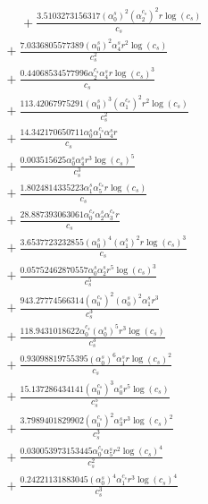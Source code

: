 \documentclass[10pt]{article}
\begin{document}
\begin{align*}
\phantom{R_{3,9}} &\phantom{={}}{}  + \frac{3.5103273156317 \left(\alpha_{0}^s\right)^{2} \left(\alpha_{2}^{c_s}\right)^{2} r \log{\left(c_{s} \right)}}{c_{s}} \\
&{}  + \frac{7.0336805577389 \left(\alpha_{0}^s\right)^{2} \alpha_{4}^s r^{2} \log{\left(c_{s} \right)}}{c_{s}^{2}} \\
&{}  + \frac{0.44068534577996 \alpha_{2}^{c_s} \alpha_{4}^s r \log{\left(c_{s} \right)}^{3}}{c_{s}} \\
&{}  + \frac{113.42067975291 \left(\alpha_{0}^s\right)^{3} \left(\alpha_{1}^{c_s}\right)^{2} r^{2} \log{\left(c_{s} \right)}}{c_{s}^{2}} \\
&{}  + \frac{14.342170650711 \alpha_{0}^s \alpha_{1}^{c_s} \alpha_{4}^s r}{c_{s}} \\
&{}  + \frac{0.003515625 \alpha_{0}^s \alpha_{4}^s r^{3} \log{\left(c_{s} \right)}^{5}}{c_{s}^{3}} \\
&{}  + \frac{1.8024814335223 \alpha_{1}^s \alpha_{5}^{c_s} r \log{\left(c_{s} \right)}}{c_{s}} \\
&{}  + \frac{28.887393063061 \alpha_{0}^{c_s} \alpha_{2}^s \alpha_{3}^{c_s} r}{c_{s}} \\
&{}  + \frac{3.6537723232855 \left(\alpha_{0}^s\right)^{4} \left(\alpha_{1}^s\right)^{2} r \log{\left(c_{s} \right)}^{3}}{c_{s}} \\
&{}  + \frac{0.05752462870557 \alpha_{0}^s \alpha_{2}^s r^{5} \log{\left(c_{s} \right)}^{3}}{c_{s}^{5}} \\
&{}  + \frac{943.27774566314 \left(\alpha_{0}^{c_s}\right)^{2} \left(\alpha_{0}^s\right)^{2} \alpha_{1}^s r^{3}}{c_{s}^{3}} \\
&{}  + \frac{118.9431018622 \alpha_{0}^{c_s} \left(\alpha_{0}^s\right)^{5} r^{3} \log{\left(c_{s} \right)}}{c_{s}^{3}} \\
&{}  + \frac{0.93098819755395 \left(\alpha_{0}^s\right)^{6} \alpha_{1}^s r \log{\left(c_{s} \right)}^{2}}{c_{s}} \\
&{}  + \frac{15.137286434141 \left(\alpha_{0}^{c_s}\right)^{3} \alpha_{0}^s r^{5} \log{\left(c_{s} \right)}}{c_{s}^{5}} \\
&{}  + \frac{3.7989401829902 \left(\alpha_{0}^{c_s}\right)^{2} \alpha_{3}^s r^{3} \log{\left(c_{s} \right)}^{2}}{c_{s}^{3}} \\
&{}  + \frac{0.030053973153445 \alpha_{0}^{c_s} \alpha_{5}^s r^{2} \log{\left(c_{s} \right)}^{4}}{c_{s}^{2}} \\
&{}  + \frac{0.24221131883045 \left(\alpha_{0}^s\right)^{4} \alpha_{1}^{c_s} r^{3} \log{\left(c_{s} \right)}^{4}}{c_{s}^{3}} \\

\end{align*}
\end{document}
